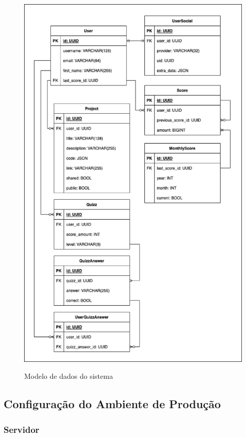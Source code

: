 \begin{figure}[H]
    \centering
    \caption{Modelo de dados do sistema}
    \includegraphics[keepaspectratio=true,scale=0.5]{figuras/modelo_de_dados.eps}
    \label{fig:modelo_dados}
\end{figure}


\subsection{Configuração do Ambiente de Produção}

\subsubsection{Servidor}

